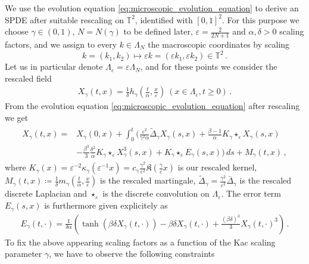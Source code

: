 \documentclass{report}
\newcommand{\TT}{\mathbb{T}}
\newcommand{\Convolve}[3][]{#2 \star_{#1} #3}
\DeclareMathOperator{\DefiningEquality}{\coloneqq}
\theoremstyle{remark}
\theoremstyle{definition}
\let\epsilon\varepsilon
\begin{document}
We use the evolution equation \eqref{eq:microscopic_evolution_equation} to derive an SPDE after suitable rescaling on $\TT^2$, identified with $[0, 1]^2$. For this purpose we choose $\gamma \in (0, 1)$, $N = N(\gamma)$ to be defined later, $\epsilon = \frac{2}{2N + 1}$ and $\alpha, \delta > 0$ scaling factors, and we assign to every $k \in \Lambda_N$ the macroscopic coordinates by scaling $$k = (k_1, k_2) \mapsto \epsilon k =(\epsilon k_1, \epsilon k_2) \in \TT^2\,.$$ Let us in particular denote $\Lambda_\epsilon = \epsilon \Lambda_N$, and for these points we consider the rescaled field
\begin{align}
  X_\gamma(t, x) = \frac{1}{\delta}h_\gamma\left(\frac{t}{\alpha}, \frac{x}{\epsilon}\right)~(x\in \Lambda_\epsilon, t \ge 0)\,.
\end{align}
From the evolution equation \eqref{eq:microscopic_evolution_equation} after rescaling we get
\begin{align}
  \label{eq:evolution_in_macroscopic_coordintes}
  \begin{split}
      X_\gamma(t, x) =& X_\gamma(0, x) + \int_{0}^{t} \biggl(\frac{\epsilon^2}{\gamma^2 \alpha}\tilde{\Delta}_\gamma X_\gamma(s, x) + \frac{\beta - 1}{\alpha} \Convolve[\epsilon]{K_\gamma}{X_\gamma(s, x)}\\
    &-\frac{\beta^3}{3} \frac{\delta^2}{\alpha} \Convolve[\epsilon]{K_\gamma}{X_\gamma^3(s, x)} + \Convolve[\epsilon]{K_\gamma}{E_\gamma(s, x)}\biggr)\,ds + M_\gamma(t, x)\,,
  \end{split}
\end{align}
where $K_\gamma(x) = \epsilon^{-2} \kappa_\gamma(\epsilon^{-1}x) = c_\gamma \frac{\gamma^2}{\epsilon^2}\mathfrak{K}\left(\frac{\gamma}{\epsilon}x\right)$ is our rescaled kernel, $M_\gamma(t, x) \DefiningEquality \frac{1}{\delta}m_\gamma\left(\frac{t}{\alpha},\frac{x}{\epsilon}\right)$ is the rescaled martingale, $\tilde{\Delta}_\gamma = \frac{\gamma^2}{\epsilon^2} \bar{\Delta}_\gamma$ is the rescaled discrete Laplacian and $\Convolve[\epsilon]{}{}$ is the discrete convolution on $\Lambda_\epsilon$. The error term $E_\gamma(s, x)$ is furthermore given explicitely as 
\begin{align}
  \label{eq:error_term}
  E_\gamma(t, \cdot) = \frac{1}{\delta \alpha}\left(\tanh\left(\beta \delta X_\gamma(t, \cdot)\right) - \beta \delta X_\gamma(t, \cdot) + \frac{(\beta \delta)^3}{3} X_\gamma(t, \cdot)^3\right)\,.
\end{align}
To fix the above appearing scaling factors as a function of the Kac scaling parameter $\gamma$, we have to observe the following constraints 
\end{document}

